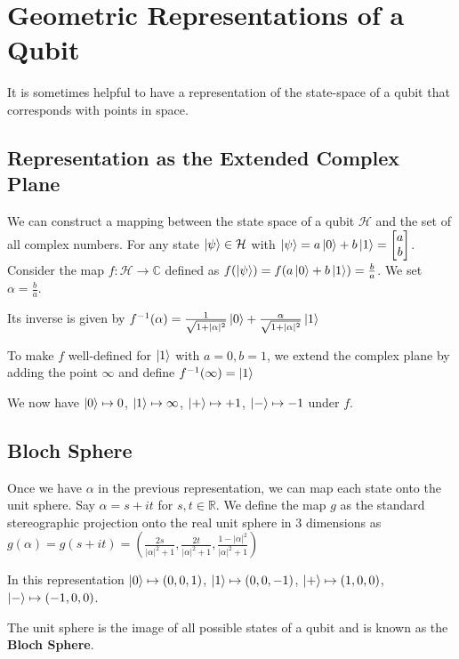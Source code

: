 \documentclass[12pt,twoside,fleqn]{report}
\theoremstyle{thmstyle}
\begin{document}
\appendix

\chapter{Geometric Representations of a Qubit}

It is sometimes helpful to have a representation of the state-space of a qubit that corresponds with points in space.

\section{Representation as the Extended Complex Plane}
We can construct a mapping between the state space of a qubit $\mathcal{H}$ and the set of all complex numbers.
For any state $\ket\psi \in \mathcal{H}$ with $\ket\psi = a \ket{0} + b \ket{1} = \begin{bmatrix} a \\ b \end{bmatrix}$.
    Consider the map $f: \mathcal{H} \to \mathbb{C}$ defined as $f(\ket\psi) = f(a \ket{0} + b \ket{1}) = \frac{b}{a}$.
    We set $\alpha = \frac{b}{a}$. 

    Its inverse is given by $f^{-1}(\alpha) = \frac{1}{\sqrt{1 + |\alpha|^2}} \ket {0} + \frac{\alpha}{\sqrt {1+|\alpha|^2}} \ket{1}$

To make $f$ well-defined for $\ket{1}$ with $a=0, b=1$, we extend the complex plane by adding the point $\infty$ and define $f^{-1}(\infty) = \ket{1}$

We now have $\ket{0} \mapsto 0$, $\ket{1} \mapsto \infty$, $\ket{+} \mapsto +1$, $\ket{-} \mapsto -1$ under $f$.


\section{Bloch Sphere}
Once we have $\alpha$ in the previous representation, we can map each state onto the unit sphere.
Say $\alpha = s + it$ for $s,t \in \mathbb{R}$.
We define the map $g$ as the standard stereographic projection onto the real unit sphere in $3$ dimensions as $g(\alpha) = g(s + it) = \left ( \frac{2s}{|\alpha|^2 + 1}, \frac{2t}{|\alpha|^2 + 1}, \frac{1-|\alpha|^2}{|\alpha|^2 + 1} \right )$

In this representation $\ket{0} \mapsto (0,0,1)$, $\ket{1} \mapsto (0,0,-1)$, $\ket{+} \mapsto (1,0,0)$, $\ket{-} \mapsto (-1,0,0)$.

The unit sphere is the image of all possible states of a qubit and is known as the \textbf{Bloch Sphere}.
\end{document}
